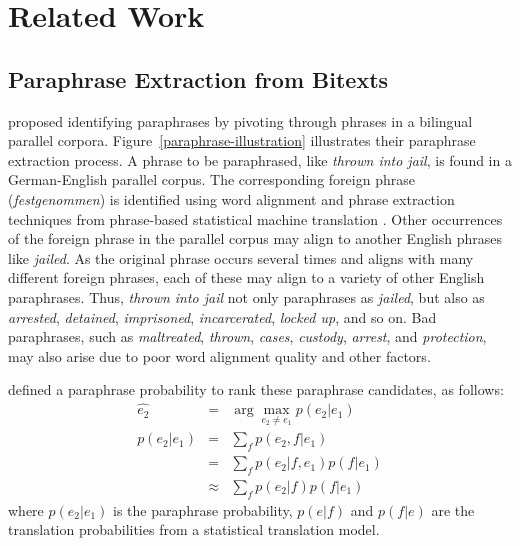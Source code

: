 \documentclass[11pt]{article}
\begin{document}
\section{Related Work}

\subsection{Paraphrase Extraction from Bitexts}

  proposed identifying paraphrases by pivoting through phrases in a bilingual parallel corpora. 
Figure~\ref{paraphrase-illustration} illustrates their paraphrase extraction process. A phrase to be paraphrased, like {\it thrown into jail}, is found in a German-English parallel corpus.  The corresponding foreign phrase ({\it festgenommen}) is identified using word alignment and phrase extraction techniques from phrase-based statistical machine translation \cite{KoehnEtAl03}.  Other occurrences of the foreign phrase in the parallel corpus may align to another English phrases like {\it jailed}.  
%
As the original phrase occurs several times and aligns with many different foreign phrases, each of these may align to a variety of other English paraphrases.  Thus, {\it thrown into jail} not only paraphrases as {\it jailed}, but also as {\it arrested}, {\it detained}, {\it imprisoned}, {\it incarcerated}, {\it locked up}, and so on.
Bad paraphrases, such as
 {\it maltreated}, {\it thrown}, {\it cases}, {\it custody}, {\it arrest}, and {\it protection}, may also arise due to poor word alignment quality and other factors.

 defined a paraphrase probability to rank these paraphrase candidates,  as follows:
\begin{eqnarray} \label{paraphrase-prob-1}
 \hat{e_2}	& = & \arg \max_{e_2 \neq e_1} p(e_2 | e_1)\label{paraphrase-prob}  \\
  p(e_2|e_1) &=& \sum_f p(e_2,f|e_1)\\
                  &=& \sum_f p(e_2|f,e_1) p(f|e_1) \\
                  &\approx& \sum_f p(e_2|f) p(f|e_1)
\label{paraphrase_prob_eqn}
\end{eqnarray}
where ${p(e_2|e_1)}$ is the paraphrase probability, ${p(e|f)}$ and ${p(f|e)}$ are the translation probabilities from a statistical translation model.  
\end{document}
